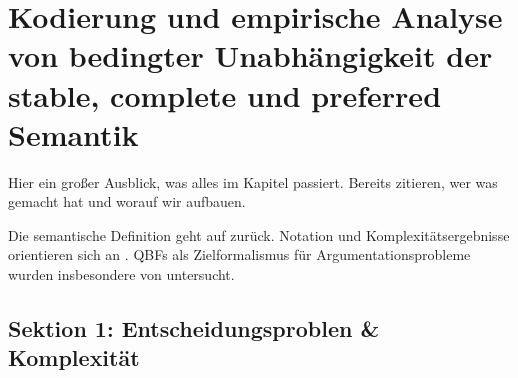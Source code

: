 \chapter{Kodierung und empirische Analyse von bedingter Unabhängigkeit der stable, complete und preferred Semantik}
\label{ch:semantic-independence}


Hier ein großer Ausblick, was alles im Kapitel passiert. Bereits zitieren, wer was gemacht hat und worauf wir aufbauen.

Die semantische Definition geht auf
\textcite{rienstra:2020:independence-af} zurück. Notation und
Komplexitätsergebnisse orientieren sich an
\textcite{bluemel:2025:independence-aba}. QBFs als Zielformalismus für
Argumentationsprobleme wurden insbesondere von
\textcite{egly:woltran:2006:reasoning-qbf} untersucht.

\section{Sektion 1: Entscheidungsproblen \& Komplexität}
\label{sec:sigma-independence-af-complexity}

